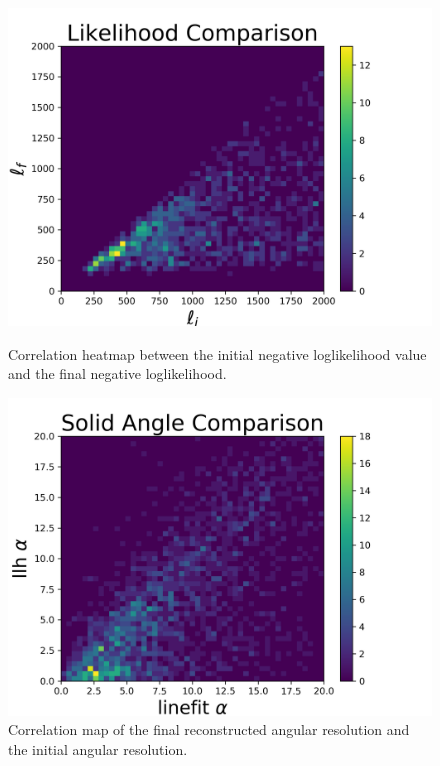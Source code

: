 \begin{figure}[ht]
  \begin{minipage}[b]{0.48\linewidth}
    \centering
    \includegraphics[width=\textwidth]{./Figures/reco_plots/llhratio_comp_heat.png}
    \caption{Correlation heatmap between the initial negative loglikelihood value and the final negative loglikelihood.}
    \label{subfig:llh_heat}
  \end{minipage}
  \hspace{0.1cm}
  \begin{minipage}[b]{0.48\linewidth}
    \centering
    \includegraphics[width=\textwidth]{./Figures/reco_plots/alpha_dist_comp_heat.png}
    \caption{Correlation map of the final reconstructed angular resolution and the initial angular resolution.}
    \label{subfig:alpha_heat}
  \end{minipage}
\end{figure}

